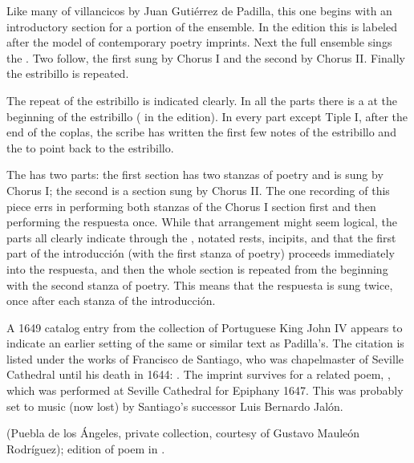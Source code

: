 
Like many of villancicos by Juan Gutiérrez de Padilla, this one begins with an
introductory section for a portion of the ensemble.
In the edition this is labeled  after the model of 
contemporary poetry imprints.
Next the full ensemble sings the .
Two  follow, the first sung by Chorus I and the second by 
Chorus II. 
Finally the estribillo is repeated.

The repeat of the estribillo is indicated clearly.
In all the parts there is a  at the beginning of the 
estribillo ( in the edition).
In every part except Tiple I, after the end of the coplas, the scribe has 
written the first few notes of the estribillo and the  to point 
back to the estribillo.

The  has two parts: the first section has two stanzas of 
poetry and is sung by Chorus I; the second is a  
section sung by Chorus II.
The one recording of this piece errs in performing both stanzas of the Chorus I 
section first and then performing the respuesta once.
While that arrangement might seem logical, the parts all clearly indicate 
through the , notated rests, incipits, and 
 that the first part of the introducción (with the first stanza 
of poetry) proceeds immediately into the respuesta, and then the whole section 
is repeated from the beginning with the second stanza of poetry.
This means that the respuesta is sung twice, once after each stanza of the 
introducción.


A 1649 catalog entry from the collection of Portuguese King John IV appears to 
indicate an earlier setting of the same or similar text as Padilla's.
The citation is listed under the works of Francisco de Santiago, who was 
chapelmaster of Seville Cathedral until his death in 1644: .%
  \Autocite[caixão 26, no.~674]{JohnIV:Catalog}
The imprint survives for a related poem, ,
which was performed at Seville Cathedral for Epiphany 1647.
This was probably set to music (now lost) by Santiago's successor Luis
Bernardo Jalón.%
\begin{Footnote}
     (Puebla de los Ángeles, private 
    collection, courtesy of Gustavo Mauleón Rodríguez); 
    edition of poem in \autocite[209]{Cashner:PhD}.
\end{Footnote}

\criticalnotesheader


